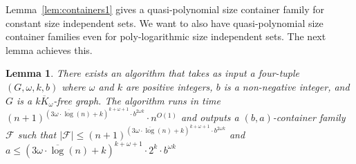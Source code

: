 \documentclass[11pt]{amsart}
\newtheorem{lemma}[theorem]{Lemma}
\newcommand{\cal}{\mathcal}
\begin{document}
Lemma~\ref{lem:containers1} gives a quasi-polynomial size container family for constant size independent sets. We want to also have quasi-polynomial size container families even for poly-logarithmic size independent sets. The next lemma achieves this. 


\begin{lemma}\label{lem:containers2}
There exists an algorithm that takes as input a four-tuple $(G, \omega, k, b)$ where $\omega$ and $k$ are positive integers, $b$ is a non-negative integer, and $G$ is a $\overline{kK_\omega}$-free graph. The algorithm runs in time  $(n+1)^{{(3\omega \cdot \overline{\log} (n) + k)^{k+\omega+1}} \cdot b^{2\omega k}} \cdot n^{O(1)}$
and outputs a $(b, a)$-container family  ${\cal F}$ such that
$|{\cal F}| \leq (n+1)^{{(3\omega \cdot \overline{\log} (n) + k)^{k+\omega+1}} \cdot b^{2\omega k}}$ and
$a \leq (3 \omega \cdot \overline{\log}(n) + k)^{k+\omega+1} \cdot 2^k\cdot b^{\omega k}$
%
\end{lemma}
\end{document}
